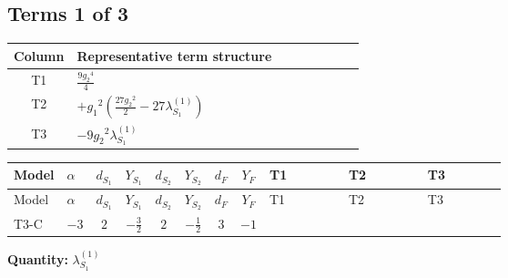 \documentclass[8pt]{article}
\begin{document}
\begin{landscape}
\subsection*{Terms 1 of 3}
\begin{center}
\begin{tabular}{@{}c >{\raggedright\arraybackslash}p{0.82\linewidth}@{}}
\toprule
Column & Representative term structure \\
\midrule
T1 & \(\displaystyle \frac{9 {g_2}^4}{4}\) \\
\midrule
T2 & \(\displaystyle +{g_1}^2 \left(\frac{27 {g_2}^2}{2}-27 {\lambda_{S_1}^{(1)}}\right)\) \\
\midrule
T3 & \(\displaystyle -9 {g_2}^2 {\lambda_{S_1}^{(1)}}\) \\
\midrule
\bottomrule
\end{tabular}
\end{center}
\smallskip
\tiny
\begin{longtable}{@{}llcccccc >{\raggedright\arraybackslash}p{0.21\linewidth} >{\raggedright\arraybackslash}p{0.21\linewidth} >{\raggedright\arraybackslash}p{0.21\linewidth}@{}}
\toprule
Model & $\alpha$ & $d_{S_1}$ & $Y_{S_1}$ & $d_{S_2}$ & $Y_{S_2}$ & $d_F$ & $Y_F$ & T1 & T2 & T3 \\
\midrule
\endfirsthead
\toprule
Model & $\alpha$ & $d_{S_1}$ & $Y_{S_1}$ & $d_{S_2}$ & $Y_{S_2}$ & $d_F$ & $Y_F$ & T1 & T2 & T3 \\
\midrule
\endhead
T3-C & $-3$ & $2$ & $-\frac{3}{2}$ & $2$ & $-\frac{1}{2}$ & $3$ & $-1$ & \scriptsize\adjustbox{max width=\linewidth}{$\begin{gathered} \frac{9 {g_2}^4}{4}\end{gathered}$} & \scriptsize\adjustbox{max width=\linewidth}{$\begin{gathered} +{g_1}^2 \left(\frac{27 {g_2}^2}{2}-27 {\lambda_{S_1}^{(1)}}\right)\end{gathered}$} & \scriptsize\adjustbox{max width=\linewidth}{$\begin{gathered} -9 {g_2}^2 {\lambda_{S_1}^{(1)}}\end{gathered}$} \\
\midrule
\bottomrule
\end{longtable}
\clearpage
\noindent\textbf{Quantity: }$\lambda_{S_1}^{(1)}$\par\smallskip

\end{landscape}
\end{document}
